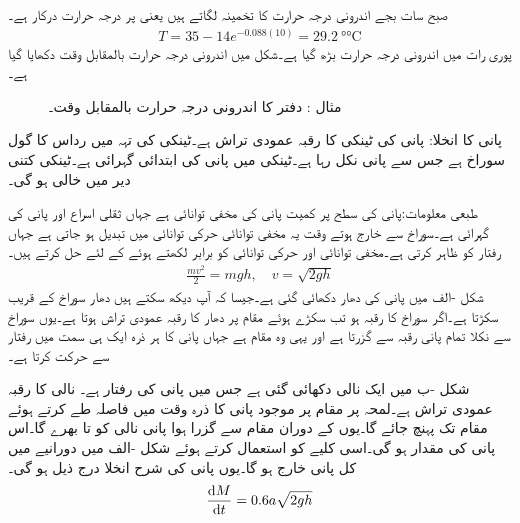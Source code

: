 صبح سات بجے اندرونی درجہ حرارت کا تخمینہ لگاتے ہیں یعنی  پر درجہ حرارت درکار ہے۔
\begin{align*}
T=35-14e^{-0.088(10)}=\SI{29.2}{\degree\celsius}
\end{align*} 
پوری رات میں اندرونی درجہ حرارت  بڑھ گیا ہے۔شکل  میں اندرونی درجہ حرارت بالمقابل وقت دکھایا گیا ہے۔
\begin{figure}
\centering
{}
\caption{مثال : دفتر کا اندرونی درجہ حرارت بالمقابل وقت۔}
\label{شکل_مثال_سادہ_اول_نیوٹن_قانون_ٹھنڈک}
\end{figure}
 \quad پانی کا انخلا:
پانی کی ٹینکی کا رقبہ عمودی تراش  ہے۔ٹینکی کی تہہ میں  رداس کا گول سوراخ ہے جس سے پانی نکل رہا ہے۔ٹینکی میں پانی کی ابتدائی گہرائی  ہے۔ٹینکی کتنی دیر میں خالی ہو گی۔

طبعی معلومات:پانی کی سطح پر  کمیت پانی کی مخفی توانائی  ہے جہاں  ثقلی اسراع اور  پانی کی گہرائی ہے۔سوراخ سے خارج ہوتے وقت یہ مخفی توانائی  حرکی توانائی  میں تبدیل ہو جاتی ہے جہاں  رفتار کو ظاہر کرتی ہے۔مخفی توانائی اور حرکی توانائی کو برابر لکھتے ہوئے  کے لئے حل کرتے ہیں۔
\begin{align*}
\frac{mv^2}{2}=mgh,\quad v=\sqrt{2gh}
\end{align*}
شکل -الف میں پانی کی دھار دکھائی گئی ہے۔جیسا کہ آپ دیکھ سکتے ہیں دھار سوراخ کے قریب سکڑتا ہے۔اگر سوراخ کا رقبہ  ہو تب سکڑے  ہوئے مقام پر دھار کا رقبہ عمودی تراش  ہوتا ہے۔یوں سوراخ سے نکلا تمام پانی رقبہ  سے گزرتا ہے اور یہی وہ مقام ہے جہاں پانی کا ہر ذرہ ایک ہی سمت میں رفتار  سے حرکت کرتا ہے۔

شکل -ب میں ایک نالی دکھائی گئی ہے جس میں پانی کی رفتار  ہے۔ نالی کا رقبہ عمودی تراش  ہے۔لمحہ  پر  مقام  پر موجود پانی کا ذرہ وقت  میں  فاصلہ طے کرتے ہوئے مقام  تک پہنچ جائے گا۔یوں  کے دوران مقام  سے گزرا ہوا پانی نالی کو  تا  بھرے گا۔اس پانی کی مقدار  ہو گی۔اسی کلیے کو استعمال کرتے ہوئے شکل -الف میں  دورانیے میں کل  پانی خارج ہو گا۔یوں پانی کی شرح انخلا درج ذیل ہو گی۔
 \begin{align}\label{مساوات_سادہ_اول_ٹورا_سلی}
\frac{\dif M}{\dif t}=0.6a\sqrt{2gh}
\end{align}
 
